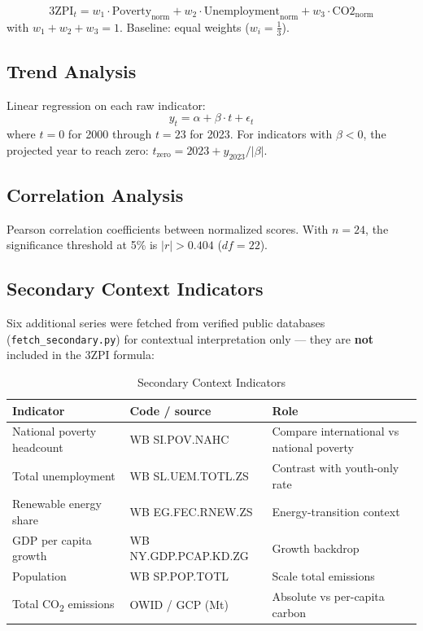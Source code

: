 \documentclass[12pt,a4paper]{article}
\begin{document}
\begin{equation}
\text{3ZPI}_t = w_1 \cdot \text{Poverty}_{\text{norm}} + w_2 \cdot \text{Unemployment}_{\text{norm}} + w_3 \cdot \text{CO2}_{\text{norm}}
\end{equation}
with $w_1 + w_2 + w_3 = 1$. Baseline: equal weights ($w_i = \frac{1}{3}$).

\subsection{Trend Analysis}

Linear regression on each raw indicator:
\begin{equation}
y_t = \alpha + \beta \cdot t + \epsilon_t
\end{equation}
where $t = 0$ for 2000 through $t = 23$ for 2023. For indicators with $\beta < 0$, the projected year to reach zero: $t_{\text{zero}} = 2023 + y_{2023}/|\beta|$.

\subsection{Correlation Analysis}

Pearson correlation coefficients between normalized scores. With $n = 24$, the significance threshold at 5\% is $|r| > 0.404$ ($df = 22$).

\subsection{Secondary Context Indicators}

Six additional series were fetched from verified public databases (\texttt{fetch\_secondary.py}) for contextual interpretation only --- they are \textbf{not} included in the 3ZPI formula:

\begin{table}[H]
\centering
\caption{Secondary Context Indicators}
\label{tab:secondary-def}
\begin{tabularx}{\textwidth}{lXl}
\toprule
Indicator & Code / source & Role \\
\midrule
National poverty headcount & WB SI.POV.NAHC & Compare international vs national poverty \\
Total unemployment & WB SL.UEM.TOTL.ZS & Contrast with youth-only rate \\
Renewable energy share & WB EG.FEC.RNEW.ZS & Energy-transition context \\
GDP per capita growth & WB NY.GDP.PCAP.KD.ZG & Growth backdrop \\
Population & WB SP.POP.TOTL & Scale total emissions \\
Total CO\textsubscript{2} emissions & OWID / GCP (Mt) & Absolute vs per-capita carbon \\
\bottomrule
\end{tabularx}
\end{table}
\end{document}
